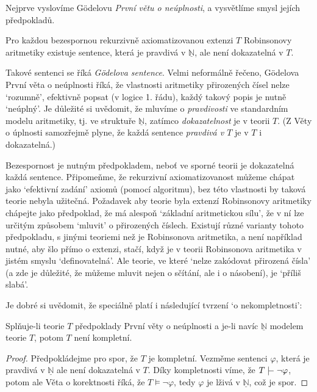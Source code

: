 Nejprve vyslovíme Gödelovu \emph{První větu o neúplnosti}, a vysvětlíme smysl jejích předpokladů.

\begin{theorem}
Pro každou bezespornou rekurzivně axiomatizovanou extenzi $T$ Robinsonovy aritmetiky existuje sentence, která je pravdivá v $\underline{\mathbb N}$, ale není dokazatelná v $T$.    
\end{theorem}

Takové sentenci se říká \emph{Gödelova sentence}. Velmi neformálně řečeno, Gödelova První věta o neúplnosti říká, že vlastnosti aritmetiky přirozených čísel nelze `rozumně', efektivně popsat (v logice 1. řádu), každý takový popis je nutně `neúplný'. Je důležité si uvědomit, že mluvíme o \emph{pravdivosti} ve standardním modelu aritmetiky, tj. ve struktuře $\underline{\mathbb N}$, zatímco \emph{dokazatelnost} je v teorii $T$. (Z Věty o úplnosti samozřejmě plyne, že každá sentence \emph{pravdivá v $T$} je v $T$ i dokazatelná.)

Bezespornost je nutným předpokladem, neboť ve sporné teorii je dokazatelná každá sentence. Připomeňme, že rekurzivní axiomatizovanost můžeme chápat jako `efektivní zadání' axiomů (pomocí algoritmu), bez této vlastnosti by taková teorie nebyla užitečná. Požadavek aby teorie byla extenzí Robinsonovy aritmetiky chápejte jako předpoklad, že má alespoň `základní aritmetickou sílu', že v ní lze určitým způsobem `mluvit' o přirozených číslech. Existují různé varianty tohoto předpokladu, s jinými teoriemi než je Robinsonova aritmetika, a není například nutné, aby šlo přímo o extenzi, stačí, když je v teorii Robinsonova aritmetika v jistém smyslu `definovatelná'. Ale teorie, ve které `nelze zakódovat přirozená čísla' (a zde je důležité, že můžeme mluvit nejen o sčítání, ale i o násobení), je `příliš slabá'.

Je dobré si uvědomit, že speciálně platí i následující tvrzení `o nekompletnosti':

\begin{corollary}
    Splňuje-li teorie $T$ předpoklady První věty o neúplnosti a je-li navíc $\underline{\mathbb N}$ modelem teorie $T$, potom $T$ není kompletní.
\end{corollary}
\begin{proof}
    Předpokládejme pro spor, že $T$ je kompletní. Vezměme sentenci $\varphi$, která je pravdivá v $\underline{\mathbb N}$ ale není dokazatelná v $T$. Díky kompletnosti víme, že $T\proves\neg\varphi$, potom ale Věta o korektnosti říká, že  $T\models\neg\varphi$, tedy $\varphi$ je lživá v $\underline{\mathbb N}$, což je spor.
\end{proof}

